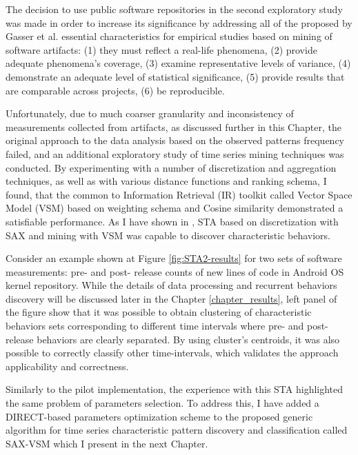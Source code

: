 The decision to use public software repositories in the second exploratory study was made in order to increase its 
significance by addressing all of the proposed by Gasser et al. \cite{citeulike:13058334} essential characteristics for 
empirical studies based on mining of software artifacts:  
(1) they must reflect a real-life phenomena, 
(2) provide adequate phenomena's coverage, 
(3) examine representative levels of variance, 
(4) demonstrate an adequate level of statistical significance,
(5) provide results that are comparable across projects,
(6) be reproducible. 

Unfortunately, due to much coarser granularity and inconsistency of measurements collected from artifacts, as discussed 
further in this Chapter, the original approach to the data analysis based on the observed patterns frequency failed, 
and an additional exploratory study of time series mining techniques was conducted.
By experimenting with a number of discretization and aggregation techniques, as well as with various
distance functions and ranking schema, I found, that the common to Information Retrieval (IR) toolkit called 
Vector Space Model (VSM) based on \tfidf weighting schema and Cosine similarity demonstrated a satisfiable performance. 
As I have shown in \cite{csdl2-11-10}, STA based on discretization with SAX and mining with VSM was capable to discover 
characteristic behaviors.

Consider an example shown at Figure \ref{fig:STA2-results} for two sets of software measurements: pre- and post- release 
counts of new lines of code in Android OS kernel repository. While the details of data processing and recurrent behaviors 
discovery will be discussed later in the Chapter \ref{chapter_results}, left panel of the figure show that it was possible to
obtain clustering of characteristic behaviors sets corresponding to different time intervals where pre- and post- release 
behaviors are clearly separated. By using cluster's centroids, it was also possible to correctly classify other time-intervals,
which validates the approach applicability and correctness.

Similarly to the pilot implementation, the experience with this STA highlighted the same problem of parameters selection. 
To address this, I have added a DIRECT-based parameters optimization scheme \cite{citeulike:12563460} to the proposed 
generic algorithm for time series characteristic pattern discovery and classification called SAX-VSM \cite{sax-vsm} which 
I present in the next Chapter. 

